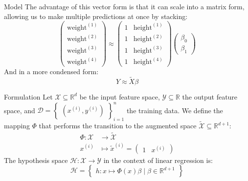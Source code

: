 \begin{frame}{Model}
	The advantage of this vector form is that it can scale into a matrix form, allowing us to make multiple predictions at once by stacking:
	\begin{equation}
		\begin{pmatrix}\text{weight}^{(1)} \\ \text{weight}^{(2)} \\ \text{weight}^{(3)} \\ \text{weight}^{(4)}\end{pmatrix} \approx \begin{pmatrix}1 & \text{height}^{(1)} \\ 1 & \text{height}^{(2)} \\ 1 & \text{height}^{(3)} \\ 1 & \text{height}^{(4)} \end{pmatrix} \begin{pmatrix}\beta_0 \\ \beta_1\end{pmatrix}
		\nonumber
	\end{equation}
	\pause
	And in a more condensed form:
	\begin{equation}
		Y \approx \tilde{X} \beta
		\nonumber
	\end{equation}
\end{frame}

\begin{frame}{Formulation}
	Let $\mathcal{X} \subseteq \mathbb{R}^d$ be the input feature space, $\mathcal{Y} \subseteq \mathbb{R}$ the output feature space, and $\mathcal{D} = \begin{Bmatrix}(x^{(i)}, y^{(i)})\end{Bmatrix}_{i=1}^n$ the training data. We define the mapping $\Phi$ that performs the transition to the augmented space $\tilde{\mathcal{X}} \subseteq \mathbb{R}^{d+1}$:
	\begin{equation}
		\begin{aligned}
			\Phi: \mathcal{X} &\to \tilde{\mathcal{X}} \\
			x^{(i)} &\mapsto \tilde{x}^{(i)} = \begin{pmatrix}1 & x^{(i)}\end{pmatrix}
			\nonumber
		\end{aligned}
	\end{equation}
	The hypothesis space $\mathcal{H}: \mathcal{X} \to \mathcal{Y}$ in the context of linear regression is:
	\begin{equation}
		\mathcal{H} = \begin{Bmatrix}h: x \mapsto \Phi(x) \beta \mid \beta \in \mathbb{R}^{d+1}\end{Bmatrix}
		\nonumber
	\end{equation}
\end{frame}

